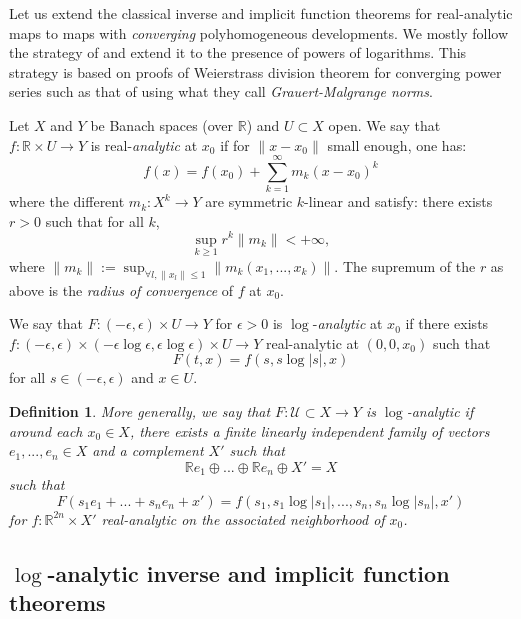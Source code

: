 \documentclass[12pt]{article}
\newtheorem{defn}[thm]{Definition}
\begin{document}
    Let us extend the classical inverse and implicit function theorems for real-analytic maps to maps with \emph{converging} polyhomogeneous developments. We mostly follow the strategy of \cite{bt} and extend it to the presence of powers of logarithms. This strategy is based on proofs of Weierstrass division theorem for converging power series such as that of \cite{lmr} using what they call \emph{Grauert-Malgrange norms}.

    Let $X$ and $Y$ be Banach spaces (over $\mathbb{R}$) and $U\subset X$ open. We say that $f: \mathbb{R}\times U\to Y$ is real-\emph{analytic} at $x_0$ if for $\|x-x_0\|$ small enough, one has:
    $$ f(x) = f(x_0)+ \sum_{k=1}^\infty m_k(x-x_0)^k $$
    where the different $m_k: X^k\to Y$ are symmetric $k$-linear and satisfy: there exists $r>0$ such that for all $k$,
    $$ \sup_{k\geqslant 1} r^k\|m_k\| <+\infty, $$
    where $\|m_k\| := \sup_{\forall l,\|x_l\|\leqslant 1} \|m_k(x_1,...,x_k)\|$. The supremum of the $r$ as above is the \emph{radius of convergence} of $f$ at $x_0$.
    
    We say that $F : (-\epsilon,\epsilon)\times U \to Y$ for $\epsilon>0$ is $\log$-\emph{analytic} at $x_0$ if there exists $f: (-\epsilon,\epsilon)\times (-\epsilon\log \epsilon,\epsilon\log \epsilon) \times U \to Y$ real-analytic at $(0,0,x_0)$ such that
    $$F(t,x) = f(s,s\log |s|,x)$$ 
    for all $ s\in (-\epsilon,\epsilon) $ and $x\in U$. 
    
    
    \begin{defn}
    More generally, we say that $F:\mathcal{U}\subset X\to Y$ is $\log$-analytic if around each $x_0\in X$, there exists a finite linearly independent family of vectors $e_1,...,e_n\in X$ and a complement $X'$ such that $$\mathbb{R}e_1\oplus...\oplus \mathbb{R}e_n\oplus X'=X$$ such that 
    $$F(s_1e_1+...+s_ne_n+x') = f(s_1,s_1\log|s_1|,...,s_n,s_n\log|s_n|,x') $$
    for $f : \mathbb{R}^{2n}\times X'$ real-analytic on the associated neighborhood of $x_0$.
    \end{defn}
    
    
    \subsection{$\log$-analytic inverse and implicit function theorems}
    
\end{document}
